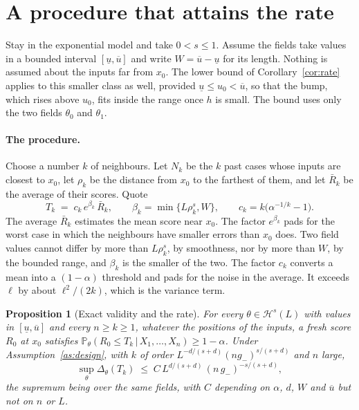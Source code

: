 \documentclass[11pt]{article}
\newtheorem{proposition}[theorem]{Proposition}
\theoremstyle{definition}
\theoremstyle{remark}
\newcommand{\Prob}{\mathbb{P}}
\newcommand{\given}{\,|\,}
\begin{document}
\section{A procedure that attains the rate}\label{sec:attain}

Stay in the exponential model and take $0<s\le1$. Assume the fields take values in a
bounded interval $[\underline u,\overline u]$ and write $W=\overline u-\underline u$ for
its length. Nothing is assumed about the inputs far from $x_0$. The lower bound of
Corollary~\ref{cor:rate} applies to this smaller class as well, provided
$\underline u\le u_0<\overline u$, so that the bump, which rises above $u_0$, fits inside
the range once $h$ is small. The bound uses only the two fields $\theta_0$ and
$\theta_1$.

\paragraph{The procedure.}
Choose a number $k$ of neighbours. Let $N_k$ be the $k$ past cases whose inputs are closest
to $x_0$, let $\rho_k$ be the distance from $x_0$ to the farthest of them, and let
$\bar R_k$ be the average of their scores. Quote
\begin{equation}\label{eq:knn}
  T_k\;=\;c_k\,e^{\beta_k}\,\bar R_k,
  \qquad \beta_k=\min\{L\rho_k^{s},W\},
  \qquad c_k=k\big(\alpha^{-1/k}-1\big).
\end{equation}
The average $\bar R_k$ estimates the mean score near $x_0$. The factor $e^{\beta_k}$ pads
for the worst case in which the neighbours have smaller errors than $x_0$ does. Two field
values cannot differ by more than $L\rho_k^s$, by smoothness, nor by more than $W$, by the
bounded range, and $\beta_k$ is the smaller of the two. The factor $c_k$ converts a mean
into a $(1-\alpha)$ threshold and pads for the noise in the average. It exceeds $\ell$ by
about $\ell^2/(2k)$, which is the variance term.

\begin{proposition}[Exact validity and the rate]\label{prop:upper}
For every $\theta\in\mathcal H^s(L)$ with values in $[\underline u,\overline u]$ and every
$n\ge k\ge1$, whatever the positions of the inputs, a fresh score $R_0$ at $x_0$ satisfies
$\Prob_\theta(R_0\le T_k\given X_1,\dots,X_n)\ge1-\alpha$. Under
Assumption~\ref{as:design}, with $k$ of order $L^{-d/(s+d)}(n g_-)^{s/(s+d)}$ and $n$
large,
\[
  \sup_{\theta}\Delta_\theta(T_k)\;\le\;C\,L^{d/(s+d)}\,(n\,g_-)^{-s/(s+d)} ,
\]
the supremum being over the same fields, with $C$ depending on $\alpha$, $d$, $W$ and
$\overline u$ but not on $n$ or $L$.
\end{proposition}
\end{document}
